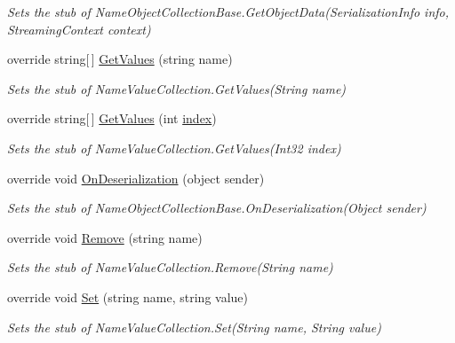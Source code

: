 \begin{DoxyCompactItemize}
\begin{DoxyCompactList}\small\item\em Sets the stub of Name\-Object\-Collection\-Base.\-Get\-Object\-Data(\-Serialization\-Info info, Streaming\-Context context)\end{DoxyCompactList}\item 
override string\mbox{[}$\,$\mbox{]} \hyperlink{class_system_1_1_collections_1_1_specialized_1_1_fakes_1_1_stub_name_value_collection_a4ef404c9c02a7bc6c64d4ea2b198d64c}{Get\-Values} (string name)
\begin{DoxyCompactList}\small\item\em Sets the stub of Name\-Value\-Collection.\-Get\-Values(\-String name)\end{DoxyCompactList}\item 
override string\mbox{[}$\,$\mbox{]} \hyperlink{class_system_1_1_collections_1_1_specialized_1_1_fakes_1_1_stub_name_value_collection_af212ff3027d3194adf700ca177f92bc4}{Get\-Values} (int \hyperlink{jquery-1_810_82-vsdoc_8js_a75bb12d1f23302a9eea93a6d89d0193e}{index})
\begin{DoxyCompactList}\small\item\em Sets the stub of Name\-Value\-Collection.\-Get\-Values(\-Int32 index)\end{DoxyCompactList}\item 
override void \hyperlink{class_system_1_1_collections_1_1_specialized_1_1_fakes_1_1_stub_name_value_collection_a940927bb38d71cb935d87a2e832ce83d}{On\-Deserialization} (object sender)
\begin{DoxyCompactList}\small\item\em Sets the stub of Name\-Object\-Collection\-Base.\-On\-Deserialization(\-Object sender)\end{DoxyCompactList}\item 
override void \hyperlink{class_system_1_1_collections_1_1_specialized_1_1_fakes_1_1_stub_name_value_collection_a9454437362fb5cc32b7cc35c96c451ca}{Remove} (string name)
\begin{DoxyCompactList}\small\item\em Sets the stub of Name\-Value\-Collection.\-Remove(\-String name)\end{DoxyCompactList}\item 
override void \hyperlink{class_system_1_1_collections_1_1_specialized_1_1_fakes_1_1_stub_name_value_collection_a3c268e9e85c4afdfc8dbead506de1f9f}{Set} (string name, string value)
\begin{DoxyCompactList}\small\item\em Sets the stub of Name\-Value\-Collection.\-Set(\-String name, String value)\end{DoxyCompactList}\end{DoxyCompactItemize}
